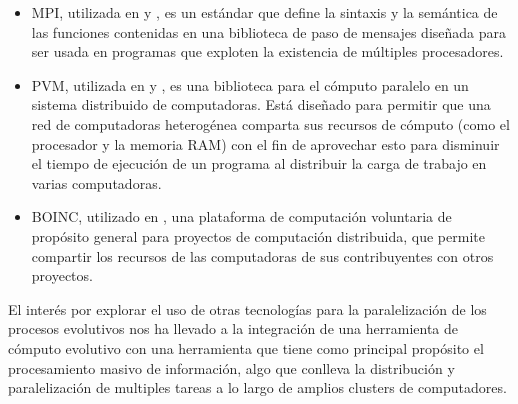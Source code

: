 \begin{itemize}
	\item MPI, utilizada en \cite{DBLP:conf/pvm/1999} y \cite{DBLP:conf/pvm/FernandezTVB00}, es un estándar que define la sintaxis y la semántica de las funciones contenidas en una biblioteca de paso de mensajes diseñada para ser usada en programas que exploten la existencia de múltiples procesadores.
	\item PVM, utilizada en \cite{DBLP:conf/pvm/FernandezSTG99} y \cite{DBLP:conf/pvm/2000}, es una biblioteca para el cómputo paralelo en un sistema distribuido de computadoras. Está diseñado para permitir que una red de computadoras heterogénea comparta sus recursos de cómputo (como el procesador y la memoria RAM) con el fin de aprovechar esto para disminuir el tiempo de ejecución de un programa al distribuir la carga de trabajo en varias computadoras.
	\item BOINC, utilizado en \cite{feki2009parallel}, una plataforma de computación voluntaria de propósito general para proyectos de computación distribuida, que permite compartir los recursos de las computadoras de sus contribuyentes con otros proyectos. 
\end{itemize}

El inter\'es por explorar el uso de otras tecnologías para la paralelizaci\'on de los procesos evolutivos nos ha llevado a la integración de una herramienta de c\'omputo evolutivo con una herramienta que tiene como principal propósito el procesamiento masivo de información, algo que conlleva la distribución y paralelizaci\'on de multiples tareas a lo largo de amplios clusters de computadores.




















